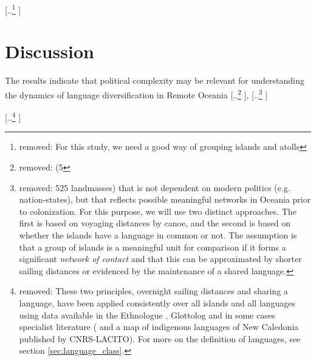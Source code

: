 \documentclass[unnumsec,webpdf,modern,medium]{oup-authoring-template}
\providecommand{\DIFaddtex}[1]{{\protect\color{blue} \sf #1}} %
\providecommand{\DIFdeltex}[1]{{\protect\color{red} [..\footnote{removed: #1} ]}} %
\providecommand{\DIFaddbegin}{} %
\providecommand{\DIFaddend}{} %
\providecommand{\DIFdelbegin}{} %
\providecommand{\DIFdelend}{} %
\providecommand{\DIFadd}[1]{\texorpdfstring{\DIFaddtex{#1}}{#1}} %
\providecommand{\DIFdel}[1]{\texorpdfstring{\DIFdeltex{#1}}{}} %
\newcommand{\DIFscaledelfig}{0.5}
\newlength{\DIFdelgraphicswidth} %
\newlength{\DIFdelgraphicsheight} %
\newcommand{\DIFaddincludegraphics}[2][]{{\color{blue}\fbox{\DIFOincludegraphics[#1]{#2}}}} %
\newcommand{\DIFdelincludegraphics}[2][]{%
\sbox{\DIFdelgraphicsbox}{\DIFOincludegraphics[#1]{#2}}%
\settoboxwidth{\DIFdelgraphicswidth}{\DIFdelgraphicsbox} %
\settoboxtotalheight{\DIFdelgraphicsheight}{\DIFdelgraphicsbox} %
\scalebox{\DIFscaledelfig}{%
\parbox[b]{\DIFdelgraphicswidth}{\usebox{\DIFdelgraphicsbox}\\[-\baselineskip] \rule{\DIFdelgraphicswidth}{0em}}\llap{\resizebox{\DIFdelgraphicswidth}{\DIFdelgraphicsheight}{%
\setlength{\unitlength}{\DIFdelgraphicswidth}%
\begin{picture}(1,1)%
\thicklines\linethickness{2pt} %
{\color[rgb]{1,0,0}\put(0,0){\framebox(1,1){}}}%
{\color[rgb]{1,0,0}\put(0,0){\line( 1,1){1}}}%
{\color[rgb]{1,0,0}\put(0,1){\line(1,-1){1}}}%
\end{picture}%
}\hspace*{3pt}}} %
} %
\DeclareRobustCommand{\DIFaddbegin}{\DIFOaddbegin \let\includegraphics\DIFaddincludegraphics} %
\DeclareRobustCommand{\DIFaddend}{\DIFOaddend \let\includegraphics\DIFOincludegraphics} %
\DeclareRobustCommand{\DIFdelbegin}{\DIFOdelbegin \let\includegraphics\DIFdelincludegraphics} %
\DeclareRobustCommand{\DIFdelend}{\DIFOaddend \let\includegraphics\DIFOincludegraphics} %
\begin{document}



\DIFdelbegin \DIFdel{For this study, we need a good way of grouping islands and atolls }\DIFdelend %
\DIFaddbegin 


\FloatBarrier
\section{\DIFadd{Discussion}}
\label{pol_study_discisson}
\DIFadd{The results indicate that political complexity may be relevant for understanding the dynamics of language diversification }\DIFaddend in Remote Oceania\DIFdelbegin \DIFdel{(5}\DIFdelend , \DIFdelbegin \DIFdel{525 landmasses) that is not dependent on modern politics (e.g. nation-states), but that reflects possible meaningful networks in Oceania prior to colonization. For this purpose, we will use two distinct approaches. The first is based on voyaging distances by canoe, and the second is based on whether the islands have a language in common or not. The assumption is that a group of islands is a meaningful unit for comparison if it forms a significant \textit{network of contact} and that this can be approximated by shorter sailing distances or evidenced by the maintenance of a shared language. }%

\DIFdel{These two principles, overnight sailing distances and sharing a language, have been applied consistently over all islands and all languages using data available in the Ethnologue \citep{ethnologue22}, Glottolog \citep{glottolog3} and in some cases specialist literature (\citet{faaniu1983tuvalu,charpentier2012linguistic, francoisetatl2015, macdonald_2020, omniglot_tuvaluan} and a map of indigenous languages of New Caledonia published by CNRS-LACITO). For more on the definition of languages, see section \ref{sec:language_class}. }%
\end{document}
